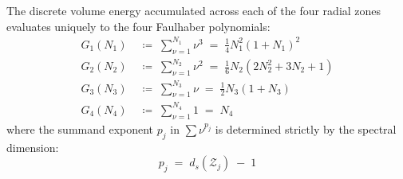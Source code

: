 \documentclass[
    12pt,
    a4paper,
    headings=normal,
    twoside=false,
    open=any,
    parskip=half
]{scrbook}
\begin{document}
\begin{phystheorem}\label{thm:ch3_faulhaber_hierarchy}
The discrete volume energy accumulated across each of the four radial zones evaluates uniquely to the four Faulhaber polynomials:
\begin{align}
G_1(N_1) &\;\coloneqq\; \sum_{\nu=1}^{N_1} \nu^3 \;=\; \frac{1}{4} N_1^2 \left( 1 + N_1 \right)^2 \label{eq:ch3_G1_formula} \\
G_2(N_2) &\;\coloneqq\; \sum_{\nu=1}^{N_2} \nu^2 \;=\; \frac{1}{6} N_2 \left( 2 N_2^2 + 3 N_2 + 1 \right) \label{eq:ch3_G2_formula} \\
G_3(N_3) &\;\coloneqq\; \sum_{\nu=1}^{N_3} \nu \;=\; \frac{1}{2} N_3 \left( 1 + N_3 \right) \label{eq:ch3_G3_formula} \\
G_4(N_4) &\;\coloneqq\; \sum_{\nu=1}^{N_4} 1 \;=\; N_4 \label{eq:ch4_G4_formula}
\end{align}
where the summand exponent $p_j$ in $\sum \nu^{p_j}$ is determined strictly by the spectral dimension:
\begin{equation}
\boxed{p_j \;=\; d_s\left( \mathcal{Z}_j \right) \;-\; 1}
\label{eq:ch3_faulhaber_exponent_rule}
\end{equation}
\end{phystheorem}
\end{document}
